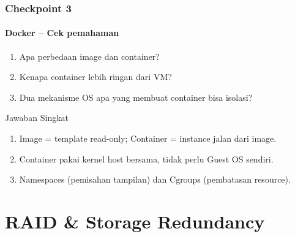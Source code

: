 \documentclass[t,aspectratio=169,xcolor=dvipsnames]{beamer}
\begin{document}
\begin{frame}
    \frametitle{Checkpoint 3}
    \framesubtitle{Docker -- Cek pemahaman}
    \small
    \begin{enumerate}
        \item Apa perbedaan image dan container?
        \item Kenapa container lebih ringan dari VM?
        \item Dua mekanisme OS apa yang membuat container bisa isolasi?
    \end{enumerate}
    \vspace{0.3cm}
    \begin{block}{Jawaban Singkat}
        \begin{enumerate}
            \item Image = template read-only; Container = instance jalan dari image.
            \item Container pakai kernel host bersama, tidak perlu Guest OS sendiri.
            \item Namespaces (pemisahan tampilan) dan Cgroups (pembatasan resource).
        \end{enumerate}
    \end{block}
\end{frame}

\section{RAID \& Storage Redundancy}
\end{document}
